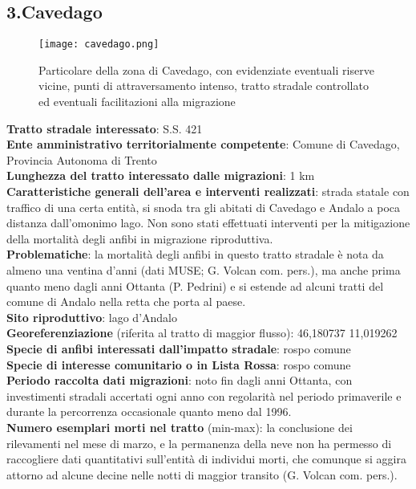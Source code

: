 \documentclass[11pt,a4paper,twoside]{memoir}
\begin{document}
\newpage
\begin{tcolorbox}[breakable,colback=white,colframe=red,width=10cm]
\subsection{3.Cavedago}
\end{tcolorbox}

\begin{figure}[H]
\label{fig:map_cavedago}
\centering
  \texttt{[image: cavedago.png]}
\caption{Particolare della zona di Cavedago, con evidenziate eventuali riserve vicine, punti di attraversamento intenso, tratto stradale controllato ed eventuali facilitazioni alla migrazione}
\end{figure}

\textbf{Tratto stradale interessato}: S.S. 421 \\
\textbf{Ente amministrativo territorialmente competente}: Comune di Cavedago, Provincia Autonoma di Trento \\
\textbf{Lunghezza del tratto interessato dalle migrazioni}: 1 km \\
\textbf{Caratteristiche generali dell’area e interventi realizzati}: strada statale con traffico di una certa entità, si snoda tra gli abitati di Cavedago e Andalo a poca distanza dall'omonimo lago. Non sono stati effettuati interventi per la mitigazione della mortalità degli anfibi in migrazione riproduttiva. \\
\textbf{Problematiche}: la mortalità degli anfibi in questo tratto stradale è nota da almeno una ventina d'anni (dati MUSE; G. Volcan com. pers.), ma anche prima quanto meno dagli anni Ottanta (P. Pedrini) e si estende ad alcuni tratti del comune di Andalo nella retta che porta al paese. \\
\textbf{Sito riproduttivo}: lago d'Andalo \\
\textbf{Georeferenziazione} (riferita al tratto di maggior flusso): 46,180737 11,019262 \\
\textbf{Specie di anfibi interessati dall’impatto stradale}: rospo comune  \\
\textbf{Specie di interesse comunitario o in Lista Rossa}: rospo comune \\
\textbf{Periodo raccolta dati migrazioni}: noto fin dagli anni Ottanta, con investimenti stradali accertati ogni anno con regolarità nel periodo primaverile e durante la percorrenza occasionale quanto meno dal 1996. \\
\textbf{Numero esemplari morti nel tratto} (min-max): la conclusione dei rilevamenti nel mese di marzo, e la permanenza della neve non ha permesso di raccogliere dati quantitativi sull’entità di individui morti, che comunque si aggira attorno ad alcune decine nelle notti di maggior transito (G. Volcan com. pers.). \\
\end{document}
